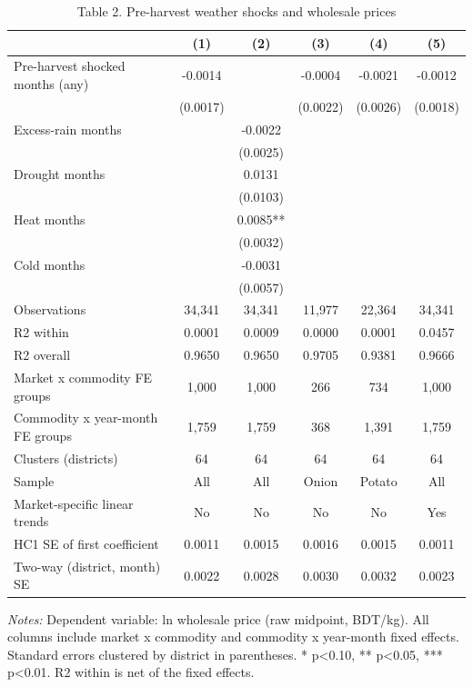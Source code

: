 \begin{table}[htbp]\centering\small
\caption{Table 2. Pre-harvest weather shocks and wholesale prices}\label{tab:table2_main_results}
\begin{tabular}{lccccc}
\toprule
 & (1) & (2) & (3) & (4) & (5) \\
\midrule
Pre-harvest shocked months (any) & -0.0014 &  & -0.0004 & -0.0021 & -0.0012 \\
 & (0.0017) &  & (0.0022) & (0.0026) & (0.0018) \\
Excess-rain months &  & -0.0022 &  &  &  \\
 &  & (0.0025) &  &  &  \\
Drought months &  & 0.0131 &  &  &  \\
 &  & (0.0103) &  &  &  \\
Heat months &  & 0.0085** &  &  &  \\
 &  & (0.0032) &  &  &  \\
Cold months &  & -0.0031 &  &  &  \\
 &  & (0.0057) &  &  &  \\
\midrule
Observations & 34,341 & 34,341 & 11,977 & 22,364 & 34,341 \\
R2 within & 0.0001 & 0.0009 & 0.0000 & 0.0001 & 0.0457 \\
R2 overall & 0.9650 & 0.9650 & 0.9705 & 0.9381 & 0.9666 \\
Market x commodity FE groups & 1,000 & 1,000 & 266 & 734 & 1,000 \\
Commodity x year-month FE groups & 1,759 & 1,759 & 368 & 1,391 & 1,759 \\
Clusters (districts) & 64 & 64 & 64 & 64 & 64 \\
Sample & All & All & Onion & Potato & All \\
Market-specific linear trends & No & No & No & No & Yes \\
HC1 SE of first coefficient & 0.0011 & 0.0015 & 0.0016 & 0.0015 & 0.0011 \\
Two-way (district, month) SE & 0.0022 & 0.0028 & 0.0030 & 0.0032 & 0.0023 \\
\bottomrule
\end{tabular}
\begin{minipage}{0.95\linewidth}\footnotesize \textit{Notes:} Dependent variable: ln wholesale price (raw midpoint, BDT/kg). All columns include market x commodity and commodity x year-month fixed effects. Standard errors clustered by district in parentheses. * p<0.10, ** p<0.05, *** p<0.01. R2 within is net of the fixed effects.\end{minipage}
\end{table}